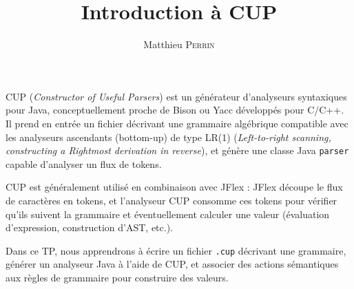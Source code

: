 \documentclass[correction]{td}
\author{Matthieu \textsc{Perrin}}
\title{Introduction à CUP}
\begin{document}
\maketitle

CUP (\emph{Constructor of Useful Parsers}) est un générateur d'analyseurs
syntaxiques pour Java, conceptuellement proche de Bison ou Yacc développés pour C/C++.
Il prend en entrée un fichier décrivant une grammaire algébrique
compatible avec les analyseurs ascendants (bottom-up) de type LR(1)
(\emph{Left-to-right scanning, constructing a Rightmost derivation in reverse}),
et génère une classe Java \texttt{parser} capable d'analyser un flux de tokens.

CUP est généralement utilisé en combinaison avec JFlex : JFlex découpe
le flux de caractères en tokens, et l'analyseur CUP consomme ces tokens
pour vérifier qu'ils suivent la grammaire et éventuellement calculer
une valeur (évaluation d'expression, construction d'AST, etc.).

Dans ce TP, nous apprendrons à écrire un fichier \texttt{.cup} décrivant une grammaire,
générer un analyseur Java à l'aide de CUP,
et associer des actions sémantiques aux règles de grammaire pour construire des valeurs.
\end{document}
